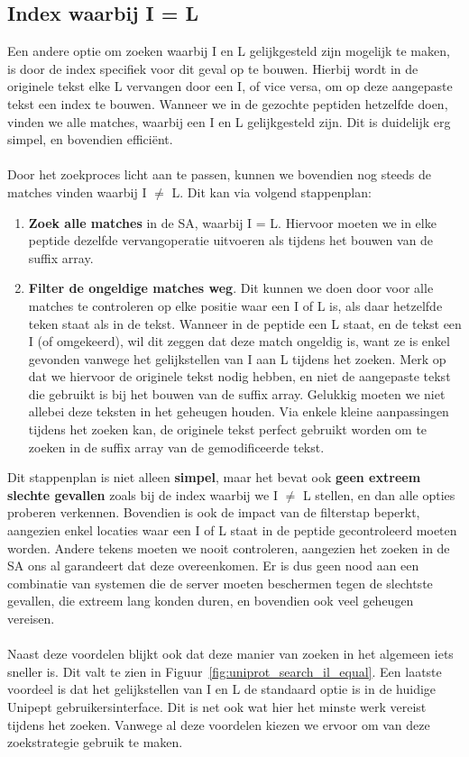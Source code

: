 \subsection{Index waarbij I = L}
Een andere optie om zoeken waarbij I en L gelijkgesteld zijn mogelijk te maken, is door de index specifiek voor dit geval op te bouwen.
Hierbij wordt in de originele tekst elke L vervangen door een I, of vice versa, om op deze aangepaste tekst een index te bouwen.
Wanneer we in de gezochte peptiden hetzelfde doen, vinden we alle matches, waarbij een I en L gelijkgesteld zijn.
Dit is duidelijk erg simpel, en bovendien efficiënt.
\\ \\
Door het zoekproces licht aan te passen, kunnen we bovendien nog steeds de matches vinden waarbij I $\neq$ L\@.
Dit kan via volgend stappenplan:
\begin{enumerate}
    \item \textbf{Zoek alle matches} in de SA, waarbij I = L\@.
    Hiervoor moeten we in elke peptide dezelfde vervangoperatie uitvoeren als tijdens het bouwen van de suffix array.
    \item \textbf{Filter de ongeldige matches weg}.
    Dit kunnen we doen door voor alle matches te controleren op elke positie waar een I of L is, als daar hetzelfde teken staat als in de tekst.
    Wanneer in de peptide een L staat, en de tekst een I (of omgekeerd), wil dit zeggen dat deze match ongeldig is, want ze is enkel gevonden vanwege het gelijkstellen van I aan L tijdens het zoeken.
    Merk op dat we hiervoor de originele tekst nodig hebben, en niet de aangepaste tekst die gebruikt is bij het bouwen van de suffix array.
    Gelukkig moeten we niet allebei deze teksten in het geheugen houden.
    Via enkele kleine aanpassingen tijdens het zoeken kan, de originele tekst perfect gebruikt worden om te zoeken in de suffix array van de gemodificeerde tekst.
\end{enumerate}

Dit stappenplan is niet alleen \textbf{simpel}, maar het bevat ook \textbf{geen extreem slechte gevallen} zoals bij de index waarbij we I $\neq$ L stellen, en dan alle opties proberen verkennen.
Bovendien is ook de impact van de filterstap beperkt, aangezien enkel locaties waar een I of L staat in de peptide gecontroleerd moeten worden.
Andere tekens moeten we nooit controleren, aangezien het zoeken in de SA ons al garandeert dat deze overeenkomen.
Er is dus geen nood aan een combinatie van systemen die de server moeten beschermen tegen de slechtste gevallen, die extreem lang konden duren, en bovendien ook veel geheugen vereisen.
\\ \\
Naast deze voordelen blijkt ook dat deze manier van zoeken in het algemeen iets sneller is.
Dit valt te zien in Figuur~\ref{fig:uniprot_search_il_equal}.
Een laatste voordeel is dat het gelijkstellen van I en L de standaard optie is in de huidige Unipept gebruikersinterface.
Dit is net ook wat hier het minste werk vereist tijdens het zoeken.
Vanwege al deze voordelen kiezen we ervoor om van deze zoekstrategie gebruik te maken.

